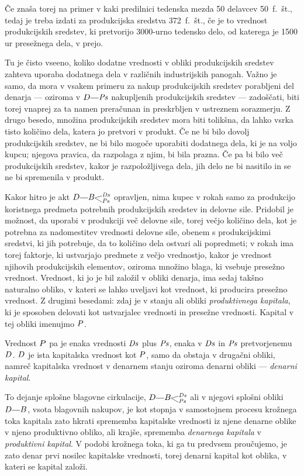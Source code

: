 \documentclass[kapital_02.tex]{subfiles}
\begin{document}
Če znaša torej na primer v kaki predilnici tedenska mezda 50 delavcev 50~f.~št., tedaj je treba izdati za produkcijska sredstva 372~f.~št., če je to vrednost produkcijskih sredstev, ki pretvorijo 3000-urno tedensko delo, od katerega je 1500 ur presežnega dela, v prejo.

Tu je čisto vseeno, koliko dodatne vrednosti v obliki produkcijskih sredstev zahteva uporaba dodatnega dela v različnih industrijskih panogah. Važno je samo, da mora v vsakem primeru za nakup produkcijskih sredstev porabljeni del denarja --- oziroma v \(\KPED\KPEcrta\KPEPs\) nakupljenih produkcijskih sredstev --- zadoščati, biti torej vnaprej za ta namen preračunan in preskrbljen v ustreznem sorazmerju. Z drugo besedo, množina produkcijskih sredstev mora biti tolikšna, da lahko vsrka tisto količino dela, katera jo pretvori v produkt. Če ne bi bilo dovolj produkcijskih sredstev, ne bi bilo mogoče uporabiti dodatnega dela, ki je na voljo kupcu; njegova pravica, da razpolaga z njim, bi bila prazna. Če pa bi bilo več produkcijskih sredstev, kakor je razpoložljivega dela, jih delo ne bi nasitilo in se ne bi spremenila v produkt.

Kakor hitro je akt \(\KPED\KPEcrta\KPEBrazcepDsPs\) opravljen, nima kupec v rokah samo za produkcijo koristnega predmeta potrebnih produkcijskih sredstev in delovne sile. Pridobil je možnost, da uporabi v produkciji več delovne sile, torej večjo količino dela, kot je potrebna za nadomestitev vrednosti delovne sile, obenem s produkcijskimi sredstvi, ki jih potrebuje, da to količino dela ostvari ali popredmeti; v rokah ima torej faktorje, ki ustvarjajo predmete z večjo vrednostjo, kakor je vrednost njihovih produkcijskih elementov, oziroma množino blaga, ki vsebuje presežno vrednost. Vrednost, ki jo je bil založil v obliki denarja, ima sedaj takšno naturalno obliko, v kateri se lahko uveljavi kot vrednost, ki producira presežno vrednost. Z drugimi besedami: zdaj je v stanju ali obliki \emph{produktivnega kapitala}, ki je sposoben delovati kot ustvarjalec vrednosti in presežne vrednosti. Kapital v tej obliki imenujmo \(P\).

Vrednost \(P\) pa je enaka vrednosti \(\mathit{Ds}\) plus \(\mathit{Ps}\), enaka v \(\mathit{Ds}\) in \(\mathit{Ps}\) pretvorjenemu \(D\). \(D\) je ista kapitalska vrednost kot \(P\), samo da obstaja v drugačni obliki, namreč kapitalska vrednost v denarnem stanju oziroma denarni obliki --- \emph{denarni kapital}.

To dejanje splošne blagovne cirkulacije, \(\KPED\KPEcrta\KPEBrazcepDsPs\) ali v njegovi splošni obliki \(\KPED\KPEcrta\KPEB\), vsota blagovnih nakupov, je kot stopnja v samostojnem procesu krožnega toka kapitala zato hkrati sprememba kapitalske vrednosti iz njene denarne oblike v njeno produktivno obliko, ali krajše, sprememba \emph{denarnega kapitala} v \emph{produktivni kapital}. V podobi krožnega toka, ki ga tu predvsem proučujemo, je zato denar prvi nosilec kapitalske vrednosti, torej denarni kapital kot oblika, v kateri se kapital založi.
\end{document}
